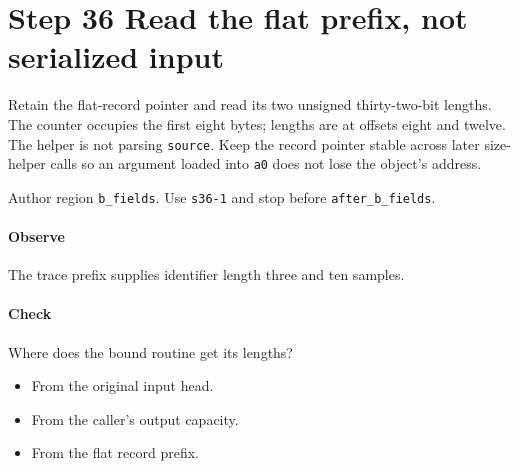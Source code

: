 \section{Step 36 Read the flat prefix, not serialized input}\label{cbor-s36}
Retain the flat-record pointer and read its two unsigned thirty-two-bit lengths. The counter occupies the first eight bytes; lengths are at offsets eight and twelve. The helper is not parsing \texttt{source}. Keep the record pointer stable across later size-helper calls so an argument loaded into \texttt{a0} does not lose the object's address.

Author region \texttt{b\_fields}. Use \texttt{s36-1} and stop before \texttt{after\_b\_fields}.

\paragraph{Observe} The trace prefix supplies identifier length three and ten samples.

\paragraph{Check} Where does the bound routine get its lengths?
\begin{itemize}
\item[A.] From the original input head.
\item[B.] From the caller's output capacity.
\item[C.] From the flat record prefix.
\end{itemize}
